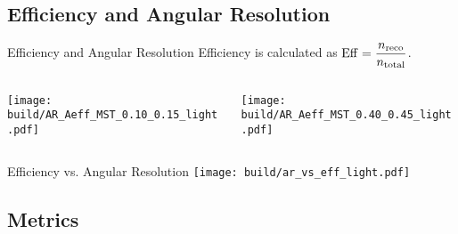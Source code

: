 \subsection{Efficiency and Angular Resolution}%
\label{sub:Efficiency_AR}

\begin{frame}{Efficiency and Angular Resolution}
    Efficiency is calculated as \(\displaystyle \operatorname{Eff} = \frac{n_\text{reco}}{n_\text{total}}\).
    \begin{columns}
        \begin{column}{0.48\textwidth}
            \centering
            \texttt{[image: build/AR\_Aeff\_MST\_0.10\_0.15\_light.pdf]}
        \end{column}
        \hspace{-3cm}
        \begin{column}{0.48\textwidth}
            \centering
            \texttt{[image: build/AR\_Aeff\_MST\_0.40\_0.45\_light.pdf]}
        \end{column}
    \end{columns}
\end{frame}

\begin{frame}{Efficiency vs. Angular Resolution}
    \centering
    \texttt{[image: build/ar\_vs\_eff\_light.pdf]}
\end{frame}

\subsection{Metrics}%
\label{sub:Metrics}

